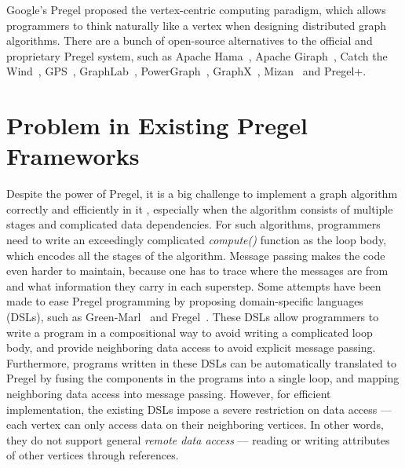 \documentclass{sokendai_thesis} %
\begin{document}
Google's Pregel \cite{pregel} proposed the vertex-centric computing paradigm, which allows programmers to think naturally like a vertex when designing distributed graph algorithms.
There are a bunch of open-source alternatives to the official and proprietary Pregel system, such as Apache Hama~\cite{hama}, Apache Giraph~\cite{giraph}, Catch the Wind~\cite{catchw}, GPS~\cite{gps}, GraphLab~\cite{graphlab}, PowerGraph~\cite{powergraph}, GraphX~\cite{graphx}, Mizan~\cite{mizan} and Pregel+\cite{pregelplus}.

\section{Problem in Existing Pregel Frameworks}

Despite the power of Pregel, it is a big challenge to implement a graph algorithm correctly and efficiently in it \cite{connectivity}, especially when the algorithm consists of multiple stages and complicated data dependencies.
For such algorithms, programmers need to write an exceedingly complicated \textit{compute()} function as the loop body, which encodes all the stages of the algorithm. %
Message passing makes the code even harder to maintain, because one has to trace where the messages are from and what information they carry in each superstep.
Some attempts have been made to ease Pregel programming by proposing domain-specific languages (DSLs), such as Green-Marl~\cite{green14} and Fregel~\cite{fregel}.
These DSLs allow programmers to write a program in a compositional way to avoid writing a complicated loop body, and provide neighboring data access to avoid explicit message passing.
Furthermore, programs written in these DSLs can be automatically translated to Pregel by fusing the components in the programs into a single loop, and mapping neighboring data access into message passing.
However, for efficient implementation, the existing DSLs impose a severe restriction on data access --- each vertex can only access data on their neighboring vertices.
In other words, they do not support general \emph{remote data access} --- reading or writing attributes of other vertices through references.
\end{document}
